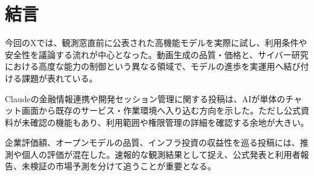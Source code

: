 \section{結言}
今回のXでは、観測窓直前に公表された高機能モデルを実際に試し、利用条件や安全性を議論する流れが中心となった。動画生成の品質・価格と、サイバー研究における高度な能力の制御という異なる領域で、モデルの進歩を実運用へ結び付ける課題が表れている。

Claudeの金融情報連携や開発セッション管理に関する投稿は、AIが単体のチャット画面から既存のサービス・作業環境へ入り込む方向を示した。ただし公式資料が未確認の機能もあり、利用範囲や権限管理の詳細を確認する余地が大きい。

企業評価額、オープンモデルの品質、インフラ投資の収益性を巡る投稿には、推測や個人の評価が混在した。速報的な観測結果として捉え、公式発表と利用者報告、未検証の市場予測を分けて追うことが重要となる。